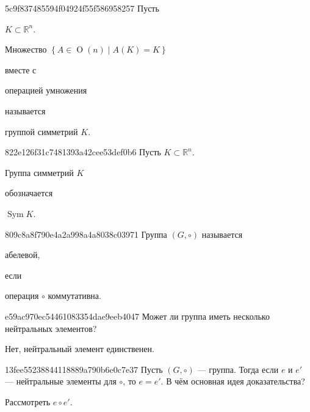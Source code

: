 \begin{note}{5c9f837485594f04924f55f586958257}
    Пусть \begin{icloze}{3}\({ K \subset \mathbb R^{n} }\).\end{icloze}
    \begin{icloze}{2}Множество \({ \left\{ A \in \operatorname{O}(n) \mid A(K) = K \right\} }\)\end{icloze} вместе с \begin{icloze}{3}операцией умножения\end{icloze} называется \begin{icloze}{1}группой симметрий \({ K }\).\end{icloze}
\end{note}

\begin{note}{822e126f31c7481393a42cee53def0b6}
    Пусть \({ K \subset \mathbb R^{n} }\).
    \begin{icloze}{2}Группа симметрий \({ K }\)\end{icloze} обозначается \begin{icloze}{1}\({ \operatorname{Sym} K }\).\end{icloze}
\end{note}

\begin{note}{809c8a8f790e4a2a998a4a8038c03971}
    Группа \({ (G, \circ) }\) называется \begin{icloze}{2}абелевой,\end{icloze} если \begin{icloze}{1}операция \({ \circ }\) коммутативна.\end{icloze}
\end{note}

\begin{note}{e59ac970ec54461083354dae9eeb4047}
    Может ли группа иметь несколько нейтральных элементов?

    \begin{cloze}{1}
        Нет, нейтральный элемент единственен.
    \end{cloze}
\end{note}

\begin{note}{13fee55238844118889a790b6e0c7e37}
    Пусть \({ (G, \circ) }\) --- группа.
    Тогда если \({ e }\) и \({ e' }\) --- нейтральные элементы для \({ \circ }\), то \({ e = e' }\). В чём основная идея доказательства?

    \begin{cloze}{1}
        Рассмотреть \({ e \circ e' }\).
    \end{cloze}
\end{note}

